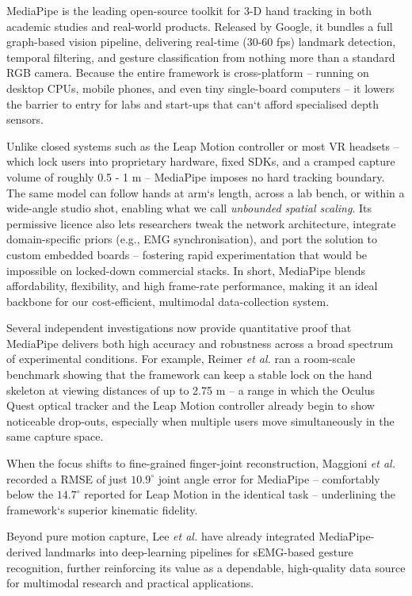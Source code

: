 MediaPipe is the leading open-source toolkit for 3-D hand tracking in both academic studies and real-world products. Released by Google, it bundles a full graph-based vision pipeline, delivering real-time (30-60 fps) landmark detection, temporal filtering, and gesture classification from nothing more than a standard RGB camera. Because the entire framework is cross-platform -- running on desktop CPUs, mobile phones, and even tiny single-board computers -- it lowers the barrier to entry for labs and start-ups that can`t afford specialised depth sensors.

Unlike closed systems such as the Leap Motion controller or most VR headsets -- which lock users into proprietary hardware, fixed SDKs, and a cramped capture volume of roughly 0.5 - 1 m -- MediaPipe imposes no hard tracking boundary. The same model can follow hands at arm`s length, across a lab bench, or within a wide-angle studio shot, enabling what we call \textit{unbounded spatial scaling}. Its permissive licence also lets researchers tweak the network architecture, integrate domain-specific priors (e.g., EMG synchronisation), and port the solution to custom embedded boards -- fostering rapid experimentation that would be impossible on locked-down commercial stacks. In short, MediaPipe blends affordability, flexibility, and high frame-rate performance, making it an ideal backbone for our cost-efficient, multimodal data-collection system.

Several independent investigations now provide quantitative proof that MediaPipe delivers both high accuracy and robustness across a broad spectrum of experimental conditions. For example, Reimer \textit{et al.} \cite{reimer2023evaluation} ran a room-scale benchmark showing that the framework can keep a stable lock on the hand skeleton at viewing distances of up to 2.75 m -- a range in which the Oculus Quest optical tracker and the Leap Motion controller already begin to show noticeable drop-outs, especially when multiple users move simultaneously in the same capture space.  

When the focus shifts to fine-grained finger-joint reconstruction, Maggioni \textit{et al.} \cite{maggioni2025optimisation} recorded a RMSE of just \(10.9^{\circ}\) joint angle error for MediaPipe -- comfortably below the \(14.7^{\circ}\) reported for Leap Motion in the identical task -- underlining the framework`s superior kinematic fidelity.  

Beyond pure motion capture, Lee \textit{et al.} \cite{lee2022explainable} have already integrated MediaPipe-derived landmarks into deep-learning pipelines for sEMG-based gesture recognition, further reinforcing its value as a dependable, high-quality data source for multimodal research and practical applications.

